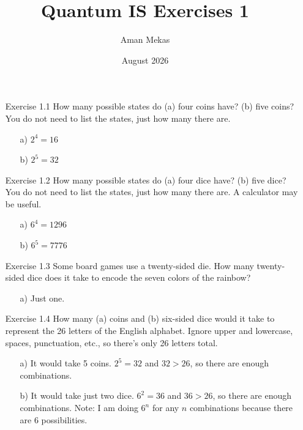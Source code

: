 \documentclass{article}
\title{Quantum IS Exercises 1}
\author{Aman Mekas}
\date{August 2026}
\begin{document}
\maketitle

\begin{enumerate}
    \item[Exercise 1.1] How many possible states do (a) four coins have? (b) five coins? You do not need to list the states, just how many there are.
    \begin{enumerate}
    \item[a)]\(2^4 = 16\)
    \item[b)]\(2^5 = 32\)\newline
    \end{enumerate}


    \item[Exercise 1.2] How many possible states do (a) four dice have? (b) five dice? You do not need to list the states, just how many there are. A calculator may be useful.
    \begin{enumerate}
    \item[a)]\(6^4 = 1296\)
    \item[b)]\(6^5 = 7776\)\newline
    \end{enumerate}


    \item[Exercise 1.3] Some board games use a twenty-sided die. How many twenty-sided dice does it take to encode the seven colors of the rainbow?
    \begin{enumerate}
    \item[a)] Just one.\newline
    \end{enumerate}


    \item[Exercise 1.4] How many (a) coins and (b) six-sided dice would it take to represent the 26 letters of the English alphabet. Ignore upper and lowercase, spaces, punctuation, etc., so there's only 26 letters total.
    \begin{enumerate}
    \item[a)] It would take 5 coins. \(2^5 = 32\) and \(32>26\), so there are enough combinations.
    \item[b)] It would take just two dice. \(6^2 = 36\) and \(36>26\), so there are enough combinations. Note: I am doing \(6^n\) for any \(n\) combinations because there are 6 possibilities.\newline
    \end{enumerate}



\end{enumerate}
\end{document}

